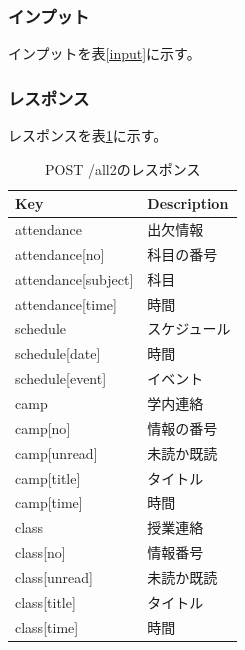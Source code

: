 \documentclass[a4j,12pt,onecolumn,oneside,titlepage,openany,final]{jreport}
\begin{document}
 \subsubsection{インプット}

 インプットを表\ref{input}に示す。
 \subsubsection{レスポンス}
 レスポンスを表\ref{all2}に示す。

 \begin{table}[htbp]
 \caption{POST /all2のレスポンス}
 \centering
 \begin{tabular}{|l|l|}
 \hline
 Key                    & Description                    \\ \hline
 attendance                   & 出欠情報 \\ \hline
 attendance{[}no{]}  & 科目の番号                           \\ \hline
 attendance{[}subject{]}         & 科目                          \\ \hline
 attendance{[}time{]}              & 時間                            \\ \hline
 schedule & スケジュール                             \\ \hline
 schedule{[}date{]} & 時間                          \\ \hline
 schedule{[}event{]} & イベント                             \\ \hline
 camp & 学内連絡                             \\ \hline
 camp{[}no{]} & 情報の番号                             \\ \hline
 camp{[}unread{]} & 未読か既読                             \\ \hline
 camp{[}title{]} & タイトル                             \\ \hline
  camp{[}time{]} & 時間                             \\ \hline
  class & 授業連絡                             \\ \hline
  class{[}no{]} & 情報番号                             \\ \hline
  class{[}unread{]} & 未読か既読                               \\ \hline
  class{[}title{]} & タイトル                                 \\ \hline
   class{[}time{]} & 時間                             \\ \hline

 \end{tabular}
 \label{all2}
 \end{table}
\end{document}
